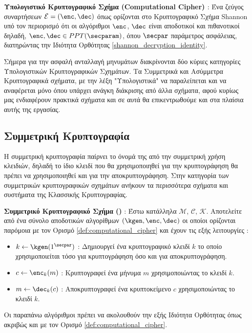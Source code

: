 \begin{definition}
\label{def:computational_cipher}
\textbf{Υπολογιστικό Κρυπτογραφικό Σχήμα (Computational Cipher) \cite{boneh2020graduate}} : Ένα ζεύγος συναρτήσεων $\mathcal{E} = (\enc, \dec)$ όπως ορίζονται στο Κρυπτογραφικό Σχήμα Shannon υπό τον περιορισμό ότι οι αλγόριθμοι $\enc$, $\dec$ είναι αποδοτικοί και πιθανοτικοί δηλαδή, $\enc, \dec \in PPT(\secparam)$, όπου $\secpar$ παράμετρος ασφάλειας, διατηρώντας την Ιδιότητα Ορθότητας \ref{shannon_decryption_identity}.
\end{definition}

Σήμερα για την ασφαλή ανταλλαγή μηνυμάτων διακρίνονται δύο κύριες κατηγορίες Υπολογιστικών Κρυπτογραφικών Σχημάτων. Τα Συμμετρικά και Ασύμμετρα Κρυπτογραφικά σχήματα, με την λέξη "Υπολογιστικά" να παραλείπεται και να αναφέρεται μόνο όπου υπάρχει ανάγκη διάκρισης από άλλα σχήματα, αφού κυρίως μας ενδιαφέρουν πρακτικά σχήματα και σε αυτά θα επικεντρωθούμε και στα πλαίσια αυτής της εργασίας.

\subsection{Συμμετρική Κρυπτογραφία}

Η συμμετρική κρυπτογραφία παίρνει το όνομά της από την συμμετρική χρήση κλειδιών, δηλαδή το ίδιο κλειδί που θα χρησιμοποιηθεί για την κρυπτογράφηση θα πρέπει να χρησιμοποιηθεί και για την αποκρυπτογράφηση. Στην κατηγορία των συμμετρικών κρυπτογραφικών σχημάτων ανήκουν τα περισσότερα σχήματα και συστήματα της Κλασσικής Κρυπτογραφίας.

\begin{definition}
\label{def:symetric_cryptographic_scheme}
\textbf{Συμμετρικό Κρυπτογραφικό Σχήμα ()} : Έστω κατάλληλα $\mathcal{M}$, $\mathcal{C}$, $\mathcal{K}$. Αποτελείτε από ένα σύνολο αποδοτικών αλγορίθμων $(\kgen, \enc, \dec)$ οι οποίοι ορίζονται παρόμοια με τον Ορισμό \ref{def:computational_cipher} και έχουν τις εξής λειτουργίες :
\begin{itemize}
    \item $k \leftarrow \kgen(1^\secpar)$ : Δημιουργεί ένα κρυπτογραφικό κλειδί $k$ το οποίο χρησιμοποιείται τόσο για κρυπτογράφηση όσο και για αποκρυπτογράφηση.
    \item $c \leftarrow \enc_{k}(m)$ : Κρυπτογραφεί ένα μήνυμα $m$ χρησιμοποιώντας το κλειδί $k$.
    \item $m \leftarrow \dec_{k}(c)$ : Αποκρυπτογραφεί ένα κρυπτοκείμενο $c$ χρησιμοποιώντας το κλειδί $k$.
\end{itemize}
Οι παραπάνω αλγόριθμοι πρέπει να ακολουθούν την εξής Ιδιότητα Ορθότητας όπως ακριβώς και με τον Ορισμό \ref{def:computational_cipher}.
\end{definition}

